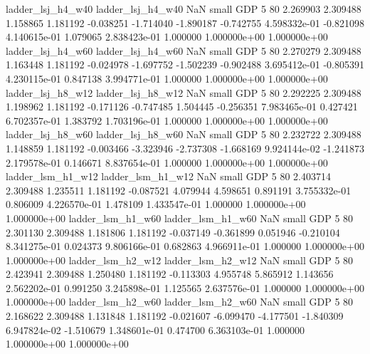        ladder_lsj_h4_w40        ladder_lsj_h4_w40                   NaN      small      GDP                 5 80 2.269903       2.309488 1.158865       1.181192   -0.038251     -1.714040     -1.890187    -0.742755   4.598332e-01 -0.821098 4.140615e-01     1.079065   2.838423e-01            1.000000    1.000000e+00        1.000000e+00
       ladder_lsj_h4_w60        ladder_lsj_h4_w60                   NaN      small      GDP                 5 80 2.270279       2.309488 1.163448       1.181192   -0.024978     -1.697752     -1.502239    -0.902488   3.695412e-01 -0.805391 4.230115e-01     0.847138   3.994771e-01            1.000000    1.000000e+00        1.000000e+00
       ladder_lsj_h8_w12        ladder_lsj_h8_w12                   NaN      small      GDP                 5 80 2.292225       2.309488 1.198962       1.181192   -0.171126     -0.747485      1.504445    -0.256351   7.983465e-01  0.427421 6.702357e-01     1.383792   1.703196e-01            1.000000    1.000000e+00        1.000000e+00
       ladder_lsj_h8_w60        ladder_lsj_h8_w60                   NaN      small      GDP                 5 80 2.232722       2.309488 1.148859       1.181192   -0.003466     -3.323946     -2.737308    -1.668169   9.924144e-02 -1.241873 2.179578e-01     0.146671   8.837654e-01            1.000000    1.000000e+00        1.000000e+00
       ladder_lsm_h1_w12        ladder_lsm_h1_w12                   NaN      small      GDP                 5 80 2.403714       2.309488 1.235511       1.181192   -0.087521      4.079944      4.598651     0.891191   3.755332e-01  0.806009 4.226570e-01     1.478109   1.433547e-01            1.000000    1.000000e+00        1.000000e+00
       ladder_lsm_h1_w60        ladder_lsm_h1_w60                   NaN      small      GDP                 5 80 2.301130       2.309488 1.181806       1.181192   -0.037149     -0.361899      0.051946    -0.210104   8.341275e-01  0.024373 9.806166e-01     0.682863   4.966911e-01            1.000000    1.000000e+00        1.000000e+00
       ladder_lsm_h2_w12        ladder_lsm_h2_w12                   NaN      small      GDP                 5 80 2.423941       2.309488 1.250480       1.181192   -0.113303      4.955748      5.865912     1.143656   2.562202e-01  0.991250 3.245898e-01     1.125565   2.637576e-01            1.000000    1.000000e+00        1.000000e+00
       ladder_lsm_h2_w60        ladder_lsm_h2_w60                   NaN      small      GDP                 5 80 2.168622       2.309488 1.131848       1.181192   -0.021607     -6.099470     -4.177501    -1.840309   6.947824e-02 -1.510679 1.348601e-01     0.474700   6.363103e-01            1.000000    1.000000e+00        1.000000e+00
